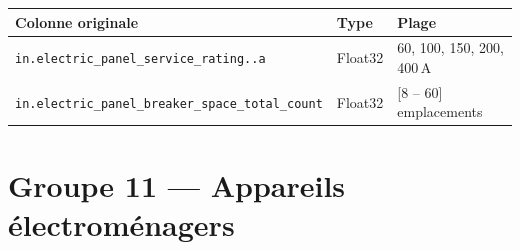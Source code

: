 \documentclass[11pt,a4paper]{article}
\begin{document}
\begin{center}
\begin{tabular}{L{7cm}L{2.5cm}L{4.5cm}}
\toprule
\textbf{Colonne originale} & \textbf{Type} & \textbf{Plage} \\
\midrule
{}
\texttt{in.electric\_panel\_service\_rating..a}
  & Float32 & 60, 100, 150, 200, 400\,A \\
\texttt{in.electric\_panel\_breaker\_space\_total\_count}
  & Float32 & [8 – 60] emplacements \\
\bottomrule
\end{tabular}
\end{center}

\section{Groupe 11 — Appareils électroménagers}
\end{document}
